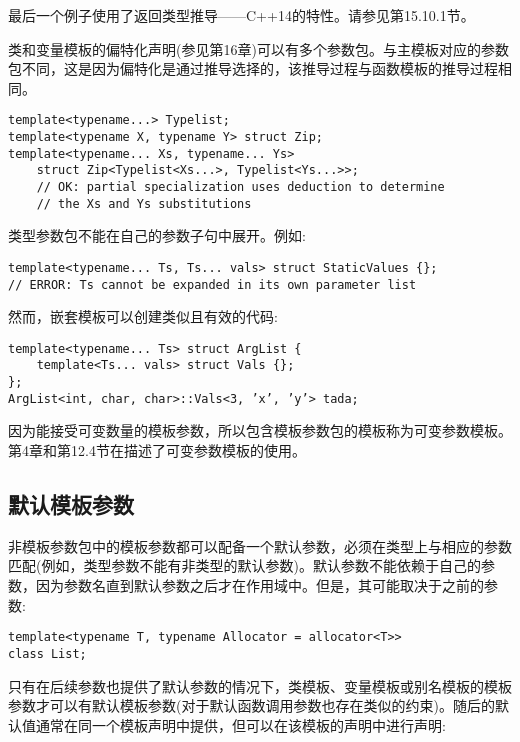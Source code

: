 最后一个例子使用了返回类型推导——C++14的特性。请参见第15.10.1节。

类和变量模板的偏特化声明(参见第16章)可以有多个参数包。与主模板对应的参数包不同，这是因为偏特化是通过推导选择的，该推导过程与函数模板的推导过程相同。

\begin{lstlisting}[style=styleCXX]
template<typename...> Typelist;
template<typename X, typename Y> struct Zip;
template<typename... Xs, typename... Ys>
	struct Zip<Typelist<Xs...>, Typelist<Ys...>>;
	// OK: partial specialization uses deduction to determine
	// the Xs and Ys substitutions
\end{lstlisting}

类型参数包不能在自己的参数子句中展开。例如:

\begin{lstlisting}[style=styleCXX]
template<typename... Ts, Ts... vals> struct StaticValues {};
// ERROR: Ts cannot be expanded in its own parameter list
\end{lstlisting}

然而，嵌套模板可以创建类似且有效的代码:

\begin{lstlisting}[style=styleCXX]
template<typename... Ts> struct ArgList {
	template<Ts... vals> struct Vals {};
};
ArgList<int, char, char>::Vals<3, ’x’, ’y’> tada;
\end{lstlisting}

因为能接受可变数量的模板参数，所以包含模板参数包的模板称为可变参数模板。第4章和第12.4节在描述了可变参数模板的使用。

\subsection{默认模板参数}

非模板参数包中的模板参数都可以配备一个默认参数，必须在类型上与相应的参数匹配(例如，类型参数不能有非类型的默认参数)。默认参数不能依赖于自己的参数，因为参数名直到默认参数之后才在作用域中。但是，其可能取决于之前的参数:

\begin{lstlisting}[style=styleCXX]
template<typename T, typename Allocator = allocator<T>>
class List;
\end{lstlisting}

只有在后续参数也提供了默认参数的情况下，类模板、变量模板或别名模板的模板参数才可以有默认模板参数(对于默认函数调用参数也存在类似的约束)。随后的默认值通常在同一个模板声明中提供，但可以在该模板的声明中进行声明:


